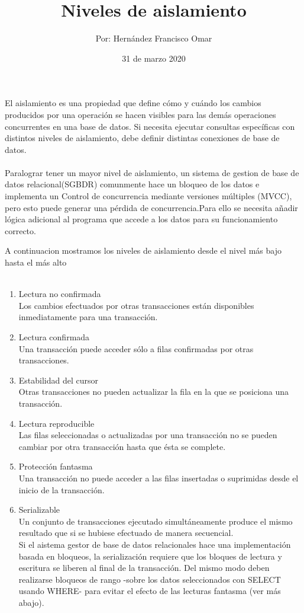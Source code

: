\documentclass[letterpaper,12pt]{article}
\title{\textbf{Niveles de aislamiento}}
\author{Por: Hernández Francisco Omar }
\date{31 de marzo 2020}
\begin{document}
\maketitle
\thispagestyle{empty}
 El  aislamiento es una propiedad que define cómo y cuándo los cambios producidos por una operación se hacen visibles para las demás operaciones concurrentes en una base de datos.
Si necesita ejecutar consultas específicas con distintos niveles de aislamiento, debe definir distintas conexiones de base de datos.\\\\

Paralograr tener un mayor nivel de aislamiento, un sistema de gestion de base de datos relacional(SGBDR) comunmente hace un bloqueo de los datos e implementa un Control de concurrencia mediante versiones múltiples (MVCC), pero esto puede generar una pérdida de concurrencia.Para ello se necesita añadir lógica adicional al programa que accede a los datos para su funcionamiento correcto.

A continuacion mostramos los niveles de aislamiento desde el nivel más bajo hasta el más alto\\\\
   \begin{enumerate}
       \item Lectura no confirmada\\
       Los cambios efectuados por otras transacciones están disponibles inmediatamente para una transacción.
       \item Lectura confirmada\\
        Una transacción puede acceder sólo a filas confirmadas por otras transacciones.
        \item Estabilidad del cursor\\
        Otras transacciones no pueden actualizar la fila en la que se posiciona una transacción.
       \item Lectura reproducible\\
       Las filas seleccionadas o actualizadas por una transacción no se pueden cambiar por otra transacción hasta que ésta se complete.
       \item Protección fantasma\\
       Una transacción no puede acceder a las filas insertadas o suprimidas desde el inicio de la transacción.
       \item Serializable\\
       Un conjunto de transacciones ejecutado simultáneamente produce el mismo resultado que si se hubiese efectuado de manera secuencial.\\
       Si el aistema gestor de base de datos relacionales hace una implementación basada en bloqueos, la serialización requiere que los bloques de lectura y escritura se liberen al final de la transacción. Del mismo modo deben realizarse bloqueos de rango -sobre los datos seleccionados con SELECT usando WHERE- para evitar el efecto de las lecturas fantasma (ver más abajo).
   \end{enumerate}
   
\end{document}
